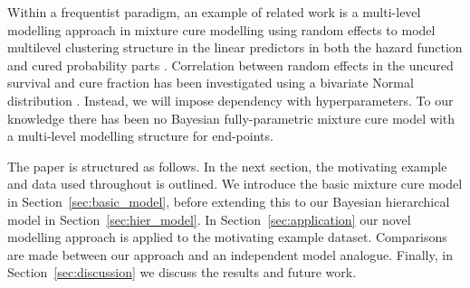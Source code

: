\documentclass[AMA,STIX1COL]{WileyNJD-v2}
\begin{document}
Within a frequentist paradigm, an example of related work is a multi-level modelling approach in mixture cure modelling using random effects to model multilevel clustering structure in the linear predictors in both the hazard function and cured probability parts \cite{Lai2009}.
Correlation between random effects in the uncured survival and cure fraction has been investigated using a bivariate Normal distribution \cite{Lai2008} \cite{Tan2018}.
Instead, we will impose dependency with hyperparameters.
To our knowledge there has been no Bayesian fully-parametric mixture cure model with a multi-level modelling structure for end-points.

The paper is structured as follows.
In the next section, the motivating example and data used throughout is outlined.
We introduce the basic mixture cure model in Section~\ref{sec:basic_model}, before extending this to our Bayesian hierarchical model in Section~\ref{sec:hier_model}.
In Section~\ref{sec:application} our novel modelling approach is applied to the motivating example dataset.
Comparisons are made between our approach and an independent model analogue.
Finally, in Section~\ref{sec:discussion} we discuss the results and future work.

%
\end{document}
